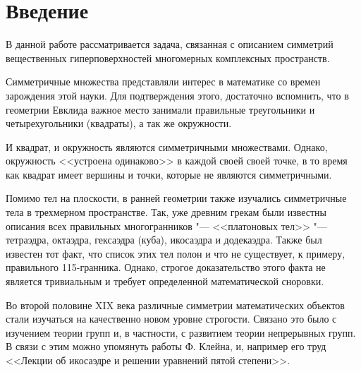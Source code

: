 \documentclass[a4paper,14pt]{extarticle}
\begin{document}



\section*{\centering Введение}
В данной работе рассматривается задача, связанная с описанием симметрий вещественных гиперповерхностей многомерных комплексных пространств.

Симметричные множества представляли интерес в математике со времен зарождения этой науки. Для подтверждения этого, достаточно вспомнить, что в геометрии Евклида важное место занимали правильные треугольники и четырехугольники (квадраты), а так же окружности. 

И квадрат, и окружность являются симметричными множествами. Однако, окружность <<устроена одинаково>> в каждой своей своей точке, в то время как квадрат имеет вершины и точки, которые не являются симметричными.

Помимо тел на плоскости, в ранней геометрии также изучались симметричные тела в трехмерном пространстве. Так, уже древним грекам были известны описания всех правильных многогранников "--- <<платоновых тел>> "--- тетраэдра, октаэдра, гексаэдра (куба), икосаэдра и додекаэдра. Также был известен тот факт, что список этих тел полон и что не существует, к примеру, правильного 115-гранника. Однако, строгое доказательство этого факта не является тривиальным и требует определенной математической сноровки.

Во второй половине XIX века различные симметрии математических объектов стали изучаться на качественно новом уровне строгости. Связано это было с изучением теории групп и, в частности, с развитием теории непрерывных групп. В связи с этим можно упомянуть работы Ф. Клейна, и, например его труд <<Лекции об икосаэдре и решении уравнений пятой степени>>.
\end{document}
